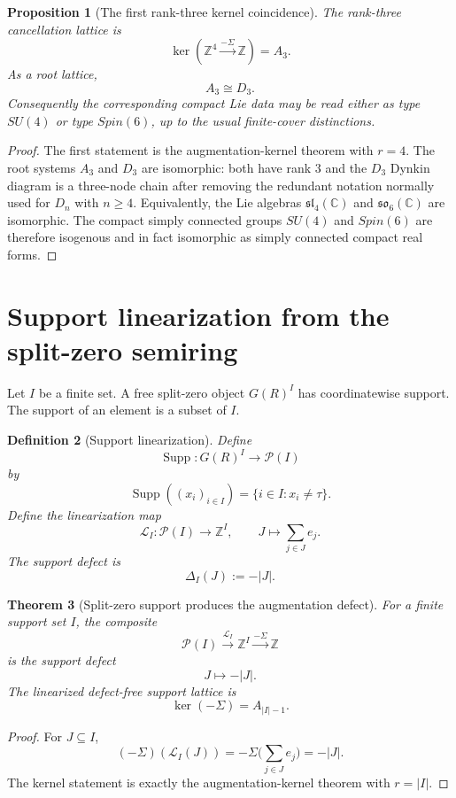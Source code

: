 \documentclass[11pt]{amsart}
\newtheorem{theorem}{Theorem}[section]
\newtheorem{proposition}[theorem]{Proposition}
\newtheorem{definition}[theorem]{Definition}
\newcommand{\ZZ}{\mathbb Z}
\newcommand{\CC}{\mathbb C}
\newcommand{\tauz}{\tau}
\begin{document}
\begin{proposition}[The first rank-three kernel coincidence]
The rank-three cancellation lattice is
\[
      \ker(\ZZ^4\xrightarrow{-\Sigma}\ZZ)=A_3.
\]
As a root lattice,
\[
      A_3\cong D_3.
\]
Consequently the corresponding compact Lie data may be read either as type $SU(4)$ or type $Spin(6)$, up to the usual finite-cover distinctions.
\end{proposition}

\begin{proof}
The first statement is the augmentation-kernel theorem with $r=4$.  The root systems $A_3$ and $D_3$ are isomorphic: both have rank $3$ and the $D_3$ Dynkin diagram is a three-node chain after removing the redundant notation normally used for $D_n$ with $n\ge4$.  Equivalently, the Lie algebras $\mathfrak{sl}_4(\CC)$ and $\mathfrak{so}_6(\CC)$ are isomorphic.  The compact simply connected groups $SU(4)$ and $Spin(6)$ are therefore isogenous and in fact isomorphic as simply connected compact real forms.\end{proof}

\section{Support linearization from the split-zero semiring}

Let $I$ be a finite set.  A free split-zero object $G(R)^I$ has coordinatewise support.  The support of an element is a subset of $I$.

\begin{definition}[Support linearization]
Define
\[
      \operatorname{Supp}:G(R)^I\to \mathcal P(I)
\]
by
\[
      \operatorname{Supp}((x_i)_{i\in I})=
      \{i\in I: x_i\ne\tauz\}.
\]
Define the linearization map
\[
      \mathcal L_I:\mathcal P(I)\to\ZZ^I,
      \qquad
      J\mapsto \sum_{j\in J}e_j.
\]
The support defect is
\[
      \Delta_I(J):=-|J|.
\]
\end{definition}

\begin{theorem}[Split-zero support produces the augmentation defect]
For a finite support set $I$, the composite
\[
       \mathcal P(I)\xrightarrow{\mathcal L_I}\ZZ^I\xrightarrow{-\Sigma}\ZZ
\]
is the support defect
\[
       J\mapsto -|J|.
\]
The linearized defect-free support lattice is
\[
       \ker(-\Sigma)=A_{|I|-1}.
\]
\end{theorem}

\begin{proof}
For $J\subseteq I$,
\[
     (-\Sigma)(\mathcal L_I(J))
       = -\Sigma\Big(\sum_{j\in J}e_j\Big)
       =-|J|.
\]
The kernel statement is exactly the augmentation-kernel theorem with $r=|I|$.\end{proof}
\end{document}
